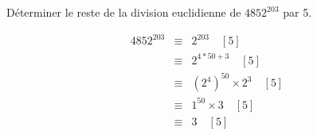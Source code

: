 \documentclass{magnolia}
\begin{document}
\begin{exoUnique}
\exo Déterminer le reste de la division euclidienne de $4852^{203}$ par 5.
  \begin{sol}
  \begin{eqnarray*}
  4852^{203}&\equiv& 2^{203} \quad [5]\\
  &\equiv& 2^{4*50+3} \quad [5]\\
  &\equiv& (2^{4})^{50}\times 2^3 \quad [5]\\
  &\equiv& 1^{50}\times 3 \quad [5]\\
  &\equiv& 3 \quad [5]
  \end{eqnarray*}
  \end{sol}
\end{exoUnique}







\end{document}
